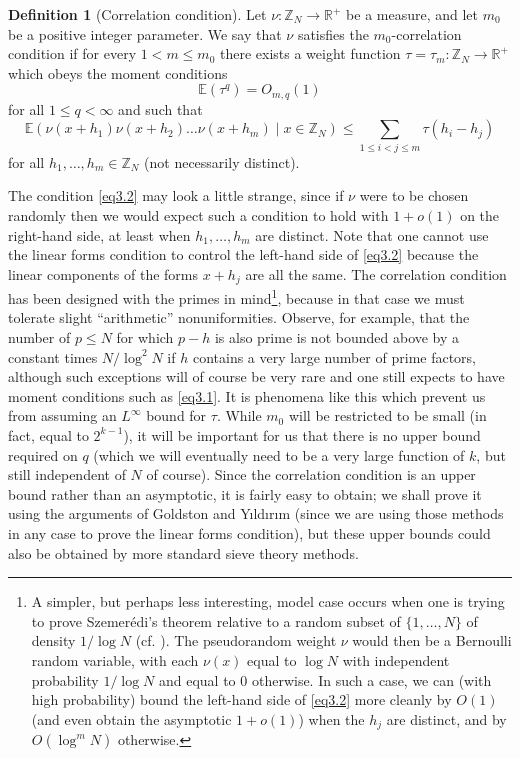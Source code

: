 \documentclass[12pt,a4paper,reqno]{amsart}
\numberwithin{equation}{section}
\theoremstyle{plain}
\theoremstyle{definition}
\newtheorem{definition}[subsection]{Definition}
\renewcommand{\leq}{\leqslant}
\def\Z{{\mathbb Z}}
\def\E{{\mathbb E}}
\def\R{{\mathbb R}}
\def\ni{\noindent}
\def\emph#1{{\it #1}}
\begin{document}
\begin{definition}[Correlation condition]\label{correlation-condition}
Let $\nu : \mathbb{Z}_N \rightarrow \mathbb{R}^{+}$ be a measure, and let $m_0$ be a positive integer parameter. We say that $\nu$ satisfies the $m_0$-correlation condition if for every $1 < m \leq m_0$
there exists a weight 
function $\tau = \tau_{m}: \mathbb{Z}_N \to \R^+$ which obeys the moment conditions
\begin{equation}\label{eq3.1}
 \E( \tau^q ) = O_{m,q}(1)
\end{equation}
for all $1 \leq q < \infty$
and such that
\begin{equation}\label{eq3.2}
\E( \nu(x+h_1) \nu(x+h_2) \ldots \nu(x+h_m) \; |\;  x \in \mathbb{Z}_N)
\leq \sum_{1 \leq i < j \leq m} \tau(h_i-h_j)
\end{equation}
for all $h_1, \ldots, h_m \in \Z_N$ (not necessarily distinct).
\end{definition}

\ni\emph{Remarks.}  The condition \eqref{eq3.2} may look a little strange, since if $\nu$ were to be chosen randomly then we would expect such a condition to hold with $1 + o(1)$ on the right-hand side, at least when $h_1,\ldots,h_m$ are distinct.  Note that one cannot use the linear
forms condition to control the left-hand side of \eqref{eq3.2} because the linear components of the forms $x + h_j$ are all the same.
 The correlation condition has been designed with the primes in mind\footnote{A simpler, but perhaps less interesting, model case occurs when one is trying to prove Szemer\'edi's theorem relative to a random subset of $\{1,\ldots,N\}$ of density $1/\log N$ (cf. \cite{klr}).  The pseudorandom weight $\nu$ would then be a Bernoulli random variable, with each $\nu(x)$ equal to $\log N$ with independent probability $1/\log N$ and equal to $0$ otherwise.  In such a case,
 we can (with high probability)
 bound the left-hand side of \eqref{eq3.2} more cleanly by $O(1)$ (and even obtain the asymptotic $1+o(1)$) 
 when the $h_j$ are distinct, and by $O(\log^m N)$ otherwise.}, 
 because in that case we must tolerate slight ``arithmetic'' nonuniformities. Observe, for example, that the number of $p \leq N$ for which $p - h$ is also prime is not bounded above by a constant times $N/\log^2 N$ if $h$ contains a very large number of prime factors, although such exceptions will of course be very rare and one still expects to have moment conditions such as \eqref{eq3.1}. It is phenomena like this which prevent us from assuming an $L^{\infty}$ bound for $\tau$.  While $m_0$ will be restricted to be small (in fact, equal to $2^{k-1}$), it will be important for us that there is no upper bound required on $q$ (which we will eventually need to be a very large function of $k$, but still independent of $N$ of course).  Since the correlation condition is an upper bound rather than an asymptotic, it is
 fairly easy to obtain; we shall prove it using the arguments of Goldston and Y{\i}ld{\i}r{\i}m (since we are using those methods in any case to prove
 the linear forms condition), but these upper bounds could also be obtained by more standard sieve theory methods.
 
\end{document}
